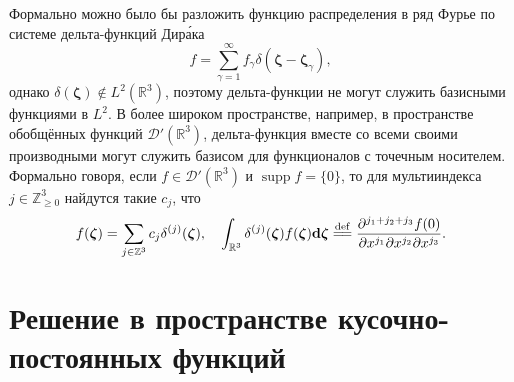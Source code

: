 \documentclass{article}
\DeclareMathOperator{\supp}{supp}
\newcommand{\dd}{\mathrm{d}}
\newcommand{\dzeta}{\boldsymbol{\dd\zeta}}
\newcommand{\bzeta}{\boldsymbol{\zeta}}
\newcommand{\eqdef}{\overset{\mathrm{def}}{=\joinrel=}}
\begin{document}
Формально можно было бы разложить функцию распределения в ряд Фурье по системе дельта-функций Дир\'{а}ка
\begin{equation}\label{eq:Dirac_basis_L2}
    f = \sum_{\gamma=1}^\infty f_\gamma\delta(\bzeta - \bzeta_\gamma),
\end{equation}
однако \(\delta(\bzeta)\notin L^2(\mathbb{R}^3)\), поэтому дельта-функции не могут служить базисными функциями в \(L^2\).
В более широком пространстве, например, в пространстве обобщённых функций \(\mathcal{D}'(\mathbb{R}^3)\),
дельта-функция вместе со всеми своими производными могут служить базисом для функционалов с точечным носителем.
Формально говоря, если \(f\in\mathcal{D}'(\mathbb{R}^3)\) и \(\supp{f}=\{0\}\),
то для мультииндекса \(j\in\mathbb{Z}_{\geqslant0}^3\) найдутся такие \({c_j}\), что
\begin{equation}\label{eq:Dirac_basis_D'}
    f(\bzeta) = \sum_{j\in\mathbb{Z}^3} c_j \delta^{(j)}(\bzeta), \quad
    \int_{\mathbb{R}^3} \delta^{(j)}(\bzeta) f(\bzeta) \dzeta \eqdef
        \frac{\partial^{j_1+j_2+j_3}f(0)}{\partial x^{j_1}\partial x^{j_2}\partial x^{j_3}}.
\end{equation}

\section{Решение в пространстве кусочно-постоянных функций}
\end{document}
